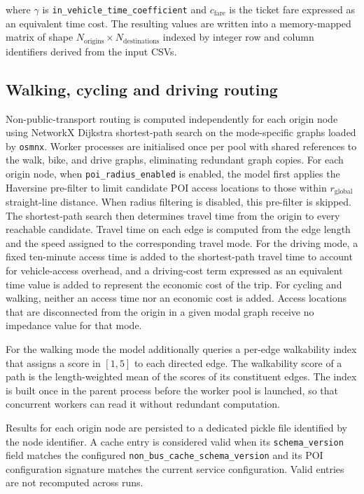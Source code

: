 \documentclass{article}
\begin{document}
\noindent where \(\gamma\) is \texttt{in\_vehicle\_time\_coefficient} and
\(c_{\text{fare}}\) is the ticket fare expressed as an equivalent time cost.
The resulting values are written into a memory-mapped matrix of shape
\(N_{\text{origins}} \times N_{\text{destinations}}\) indexed by integer row
and column identifiers derived from the input CSVs.

\subsection{Walking, cycling and driving routing}
Non-public-transport routing is computed independently for each origin node
using NetworkX Dijkstra shortest-path search on the mode-specific graphs
loaded by \texttt{osmnx}. Worker processes are initialised once per pool
with shared references to the walk, bike, and drive graphs, eliminating
redundant graph copies. For each origin node, when \texttt{poi\_radius\_enabled} is enabled, the model
first applies the Haversine pre-filter to limit candidate POI access locations
to those within \(r_{\text{global}}\) straight-line distance. When radius
filtering is disabled, this pre-filter is skipped. The shortest-path search then
determines travel time from the origin to every reachable candidate.
Travel time on each edge is computed from the edge length and the speed
assigned to the corresponding travel mode. For the driving mode, a fixed ten-minute access time is added to the
shortest-path travel time to account for vehicle-access overhead, and a
driving-cost term expressed as an equivalent time value is added to represent
the economic cost of the trip. For cycling
and walking, neither an access time nor an economic cost is added. Access
locations that are disconnected from the origin in a given modal graph receive
no impedance value for that mode.

For the walking mode the model additionally queries a per-edge walkability
index that assigns a score in \([1,5]\) to each directed edge. The walkability
score of a path is the length-weighted mean of the scores of its constituent
edges. The index is built once in the parent process before the worker pool
is launched, so that concurrent workers can read it without redundant
computation.

Results for each origin node are persisted to a dedicated pickle file
identified by the node identifier. A cache entry is considered valid when its
\texttt{schema\_version} field matches the configured
\texttt{non\_bus\_cache\_schema\_version} and its POI configuration signature
matches the current service configuration. Valid entries are not recomputed
across runs.
\end{document}
